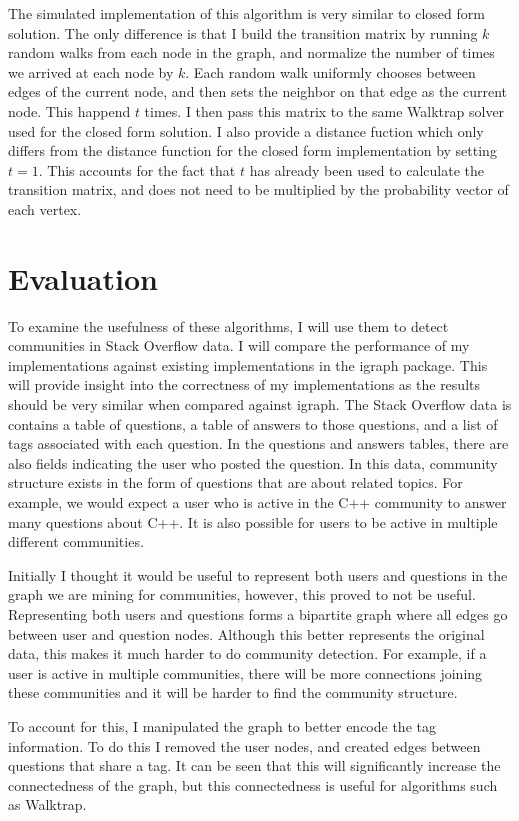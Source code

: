 \documentclass{article}
\begin{document}
    The simulated implementation of this algorithm is very similar to closed form solution. The only difference is that I build the transition matrix by running $k$ random walks from each node in the graph, and normalize the number of times we arrived at each node by $k$. Each random walk uniformly chooses between edges of the current node, and then sets the neighbor on that edge as the current node. This happend $t$ times. I then pass this matrix to the same Walktrap solver used for the closed form solution. I also provide a distance fuction which only differs from the distance function for the closed form implementation by setting $t = 1$. This accounts for the fact that $t$ has already been used to calculate the transition matrix, and does not need to be multiplied by the probability vector of each vertex.

\section{Evaluation}
To examine the usefulness of these algorithms, I will use them to detect communities in Stack Overflow data. I will compare the performance of my implementations against existing implementations in the igraph package. This will provide insight into the correctness of my implementations as the results should be very similar when compared against igraph. The Stack Overflow data is contains a table of questions, a table of answers to those questions, and a list of tags associated with each question. In the questions and answers tables, there are also fields indicating the user who posted the question. In this data, community structure exists in the form of questions that are about related topics. For example, we would expect a user who is active in the C++ community to answer many questions about C++. It is also possible for users to be active in multiple different communities.
\par
Initially I thought it would be useful to represent both users and questions in the graph we are mining for communities, however, this proved to not be useful. Representing both users and questions forms a bipartite graph where all edges go between user and question nodes. Although this better represents the original data, this makes it much harder to do community detection. For example, if a user is active in multiple communities, there will be more connections joining these communities and it will be harder to find the community structure.
\par
To account for this, I manipulated the graph to better encode the tag information. To do this I removed the user nodes, and created edges between questions that share a tag. It can be seen that this will significantly increase the connectedness of the graph, but this connectedness is useful for algorithms such as Walktrap.
\end{document}

